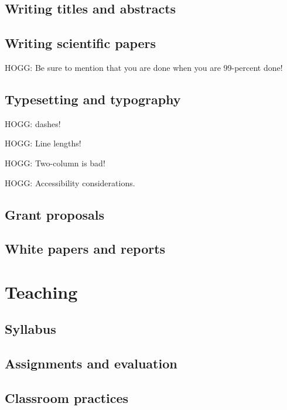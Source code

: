 \documentclass[letterpaper]{book}
\begin{document}
\chapter{Writing titles and abstracts}\label{ch:abstracts}

\chapter{Writing scientific papers}\label{ch:papers}

HOGG: Be sure to mention that you are done when you are 99-percent done!

\chapter{Typesetting and typography}

HOGG: dashes!

HOGG: Line lengths!

HOGG: Two-column is bad!

HOGG: Accessibility considerations.

\chapter{Grant proposals}


\chapter{White papers and reports}

\part{Teaching}

\chapter{Syllabus}

\chapter{Assignments and evaluation}

\chapter{Classroom practices}
\end{document}
